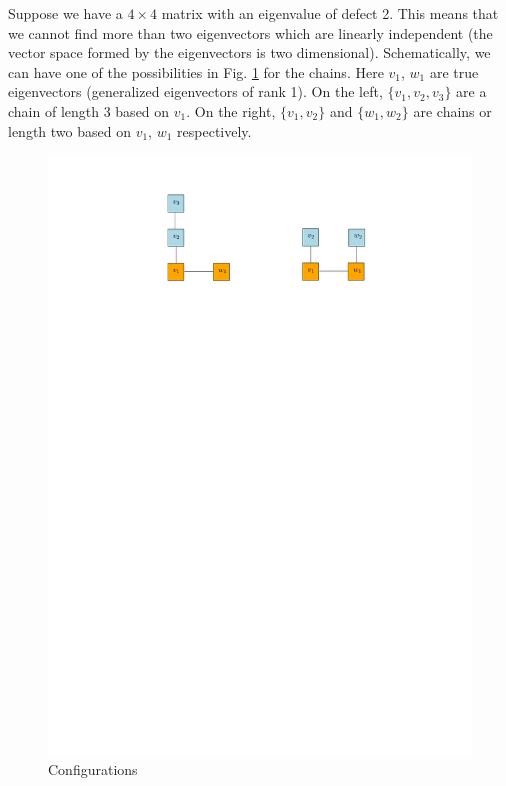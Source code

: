 \documentclass[12pt]{article}
\begin{document}
\begin{example}
	Suppose we have a $4\times 4$ matrix with an eigenvalue of defect 2. 
	This means that we cannot find more than two eigenvectors which are linearly independent (the vector space formed by the eigenvectors is two dimensional).
	Schematically, we can have one of the possibilities in Fig. \ref{figure} for the chains.
	Here $v_1$, $w_1$ are true eigenvectors (generalized eigenvectors of rank 1).
	On the left, $\{v_1,v_2,v_3\}$ are a chain of length 3 based on $v_1$.
	On the right, $\{v_1, v_2\}$ and $\{w_1, w_2\}$ are chains or length two based on $v_1$, $w_1$ respectively.
	\begin{figure}[h]
	\begin{center}
		\includegraphics[scale=1]{eigenvectors.pdf}
		\end{center}
		\label{figure}
		\caption{Configurations}
	\end{figure}
	
		
\end{example}
\end{document}
